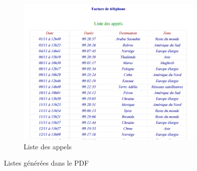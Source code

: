 \begin{figure}[ht]
\begin{subfigure}{.33\textwidth}
    \includegraphics[width=\textwidth]{images/Plateforme/liste_appels_pdf}
    \caption{Liste des appels}
    \label{fig:liste_appels_pdf}
  \end{subfigure}
  \caption{Listes générées dans le PDF}
\end{figure}


